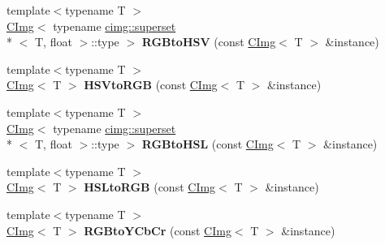 \begin{DoxyCompactItemize}
\item 
\hypertarget{namespacecimg__library_a9526fbea353956bdf98b32ef07cf5664}{{\footnotesize template$<$typename T $>$ }\\\hyperlink{structcimg__library_1_1_c_img}{C\-Img}$<$ typename \hyperlink{structcimg__library_1_1cimg_1_1superset}{cimg\-::superset}\\*
$<$ T, float $>$\-::type $>$ {\bfseries R\-G\-Bto\-H\-S\-V} (const \hyperlink{structcimg__library_1_1_c_img}{C\-Img}$<$ T $>$ \&instance)}\label{namespacecimg__library_a9526fbea353956bdf98b32ef07cf5664}

\item 
\hypertarget{namespacecimg__library_a986f3f1032bdfc3c31f4e831f4227fa9}{{\footnotesize template$<$typename T $>$ }\\\hyperlink{structcimg__library_1_1_c_img}{C\-Img}$<$ T $>$ {\bfseries H\-S\-Vto\-R\-G\-B} (const \hyperlink{structcimg__library_1_1_c_img}{C\-Img}$<$ T $>$ \&instance)}\label{namespacecimg__library_a986f3f1032bdfc3c31f4e831f4227fa9}

\item 
\hypertarget{namespacecimg__library_a5804953e2a98ee98857382bec5995f9e}{{\footnotesize template$<$typename T $>$ }\\\hyperlink{structcimg__library_1_1_c_img}{C\-Img}$<$ typename \hyperlink{structcimg__library_1_1cimg_1_1superset}{cimg\-::superset}\\*
$<$ T, float $>$\-::type $>$ {\bfseries R\-G\-Bto\-H\-S\-L} (const \hyperlink{structcimg__library_1_1_c_img}{C\-Img}$<$ T $>$ \&instance)}\label{namespacecimg__library_a5804953e2a98ee98857382bec5995f9e}

\item 
\hypertarget{namespacecimg__library_a98eaa20d4af3bd8db4f1d82255af690c}{{\footnotesize template$<$typename T $>$ }\\\hyperlink{structcimg__library_1_1_c_img}{C\-Img}$<$ T $>$ {\bfseries H\-S\-Lto\-R\-G\-B} (const \hyperlink{structcimg__library_1_1_c_img}{C\-Img}$<$ T $>$ \&instance)}\label{namespacecimg__library_a98eaa20d4af3bd8db4f1d82255af690c}

\item 
\hypertarget{namespacecimg__library_a92d4a39b74385deca067d18329b1caff}{{\footnotesize template$<$typename T $>$ }\\\hyperlink{structcimg__library_1_1_c_img}{C\-Img}$<$ T $>$ {\bfseries R\-G\-Bto\-Y\-Cb\-Cr} (const \hyperlink{structcimg__library_1_1_c_img}{C\-Img}$<$ T $>$ \&instance)}\label{namespacecimg__library_a92d4a39b74385deca067d18329b1caff}


\end{DoxyCompactItemize}

